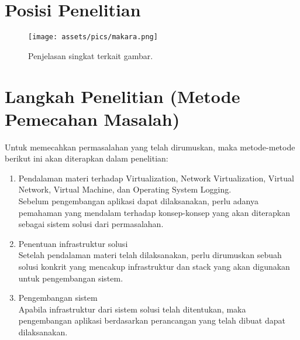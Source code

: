 \section{Posisi Penelitian}
\label{sec:posisiPenelitian}

\begin{figure}
	\centering
	\texttt{[image: assets/pics/makara.png]}
	\caption{Penjelasan singkat terkait gambar.}
	\label{fig:research_position}
\end{figure}

\noindent{}


\section{Langkah Penelitian (Metode Pemecahan Masalah)}
\label{sec:langkahPenelitian}
Untuk memecahkan permasalahan yang telah dirumuskan, maka metode-metode berikut ini akan diterapkan dalam penelitian:
\begin{enumerate}
	\item Pendalaman materi terhadap Virtualization, Network Virtualization, Virtual Network, Virtual Machine, dan Operating System Logging. \\
	Sebelum pengembangan aplikasi dapat dilaksanakan, perlu adanya pemahaman yang mendalam terhadap konsep-konsep yang akan diterapkan sebagai sistem solusi dari permasalahan.
	\item Penentuan infrastruktur solusi \\
	Setelah pendalaman materi telah dilaksanakan, perlu dirumuskan sebuah solusi konkrit yang mencakup infrastruktur dan stack yang akan digunakan untuk pengembangan sistem.
	\item Pengembangan sistem \\
	Apabila infrastruktur dari sistem solusi telah ditentukan, maka pengembangan aplikasi berdasarkan perancangan yang telah dibuat dapat dilaksanakan.
\end{enumerate}


